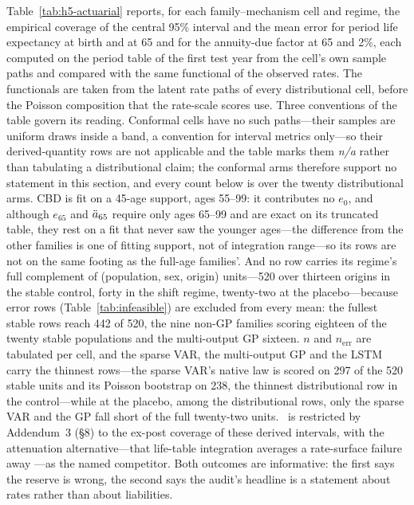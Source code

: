 Table~\ref{tab:h5-actuarial} reports, for each family--mechanism cell and
regime, the empirical coverage of the central 95\% interval and the mean
error for period life expectancy at birth and at 65 and for the annuity-due
factor at 65 and 2\%, each computed on the period table of the first test
year from the cell's own sample paths and compared with the same functional
of the observed rates. The functionals are taken from the latent rate paths
of every distributional cell, before the Poisson composition that the
rate-scale scores use. Three conventions of the table govern its reading.
Conformal cells have no such paths---their samples are uniform draws inside
a band, a convention for interval metrics only---so their derived-quantity
rows are not applicable and the table marks them \emph{n/a} rather than
tabulating a distributional claim; the conformal arms therefore support no
statement in this section, and every count below is over the twenty
distributional arms. CBD is fit on a 45-age support, ages 55--99: it
contributes no $e_0$, and although $e_{65}$ and $\ddot{a}_{65}$ require only
ages 65--99 and are exact on its truncated table, they rest on a fit that
never saw the younger ages---the difference from the other families is one
of fitting support, not of integration range---so its rows are not on the
same footing as the full-age families'. And no row carries its regime's
full complement of (population, sex, origin) units---520 over thirteen
origins in the stable control, forty in the shift regime, twenty-two at the
placebo---because error rows (Table~\ref{tab:infeasible}) are excluded from
every mean: the fullest stable rows reach 442 of 520, the nine non-GP
families scoring eighteen of the twenty stable populations and the
multi-output GP sixteen. $n$ and $n_{\mathrm{err}}$ are tabulated per cell,
and the sparse VAR, the multi-output GP and the LSTM carry the thinnest
rows---the sparse VAR's native law is scored on 297 of the 520 stable units
and its Poisson bootstrap on 238, the thinnest distributional row in the
control---while at the placebo, among the distributional rows, only the
sparse VAR and the GP fall short of the full twenty-two units. \Hfive\ is
restricted by Addendum~3 (\S8) to the ex-post coverage of these derived
intervals, with
the attenuation alternative---that life-table integration averages a
rate-surface failure away \citep{cairns2011mortality}---as the named
competitor. Both outcomes are informative: the first says the reserve is
wrong, the second says the audit's headline is a statement about rates
rather than about liabilities.

